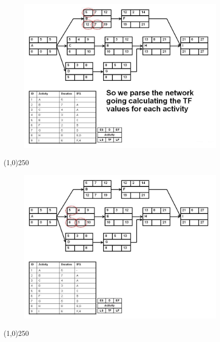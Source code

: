 \begin{frame}
\begin{figure}
	\centering
		\includegraphics[width = 10.0cm]{oldnotes/Slide162.jpg}
\end{figure}
\end{frame}
\begin{center}\line(1,0){250}\end{center}




\begin{frame}
\begin{figure}
	\centering
		\includegraphics[width = 10.0cm]{oldnotes/Slide163.jpg}
\end{figure}
\end{frame}
\begin{center}\line(1,0){250}\end{center}




